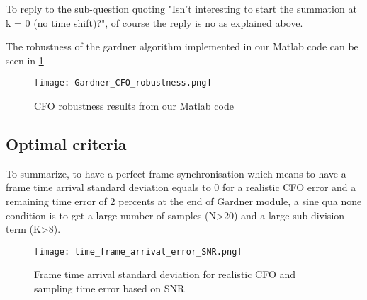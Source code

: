 To reply to the sub-question quoting "Isn’t interesting to start the summation at k = 0 (no time shift)?", of course the reply is no as explained above.

The robustness of the gardner algorithm implemented in our Matlab code can be seen in \ref{fig:Gardner_CFO_robustness}

\begin{figure}[H]
    \centering
    \texttt{[image: Gardner\_CFO\_robustness.png]}
    \caption{CFO robustness results from our Matlab code}
    \label{fig:Gardner_CFO_robustness}
\end{figure}

\subsection{Optimal criteria}

To summarize, to have a perfect frame synchronisation which means to have a frame time arrival standard deviation equals to 0 for a realistic CFO
error and a remaining time error of 2 percents at the end of Gardner module, a sine qua none condition is to get a large number of 
samples (N>20) and a large sub-division term (K>8).

\begin{figure}[H]
    \centering
    \texttt{[image: time\_frame\_arrival\_error\_SNR.png]}
    \caption{Frame time arrival standard deviation for realistic CFO and sampling time error based on SNR}
    \label{fig:time_frame_arrival_error_SNR}
\end{figure}